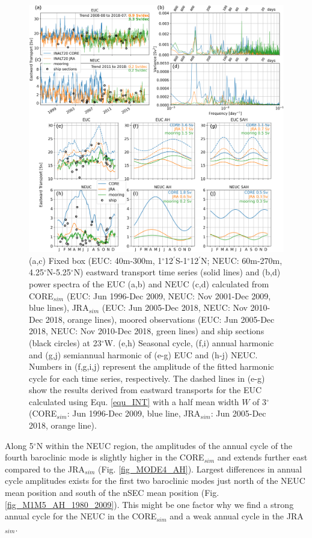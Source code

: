 \documentclass[os, manuscript]{copernicus}
\begin{document}
\begin{figure}[t]
	\includegraphics[width=12cm]{../../figures/paper/f05_EUC_NEUC_comp.eps}
	\caption{(a,c) Fixed box (EUC: 40m-300m, 1$^{\circ}$12$^\prime$S-1$^{\circ}$12$^\prime$N; NEUC: 60m-270m, 4.25$^{\circ}$N-5.25$^{\circ}$N) eastward transport time series (solid lines) and (b,d) power spectra of the EUC (a,b) and NEUC (c,d) calculated from CORE$_{sim}$ (EUC: Jun 1996-Dec 2009, NEUC: Nov 2001-Dec 2009, blue lines), JRA$_{sim}$ (EUC: Jun 2005-Dec 2018, NEUC: Nov 2010-Dec 2018, orange lines), moored observations (EUC: Jun 2005-Dec 2018, NEUC: Nov 2010-Dec 2018, green lines) and ship sections (black circles) at 23$^{\circ}$W. (e,h) Seasonal cycle, (f,i) annual harmonic and (g,j) semiannual harmonic of (e-g) EUC and (h-j) NEUC. Numbers in (f,g,i,j) represent the amplitude of the fitted harmonic cycle for each time series, respectively. The dashed lines in (e-g) show the results derived from eastward transports for the EUC calculated using Equ. \ref{equ_INT} with a half mean width $ W $ of 3$^{\circ}$ (CORE$_{sim}$: Jun 1996-Dec 2009, blue line, JRA$_{sim}$: Jun 2005-Dec 2018, orange line).}
	\label{fig_EUC_NEUC_ts}
\end{figure}

Along 5$^{\circ}$N within the NEUC region, the amplitudes of the annual cycle of the fourth baroclinic mode is slightly higher in the CORE$_{sim}$ and extends further east compared to the JRA$_{sim}$ (Fig. \ref{fig_MODE4_AH}). Largest differences in annual cycle amplitudes exists for the first two baroclinic modes just north of the NEUC mean position and south of the nSEC mean position (Fig. \ref{fig_M1M5_AH_1980_2009}). This might be one factor why we find a strong annual cycle for the NEUC in the CORE$_{sim}$ and a weak annual cycle in the JRA$_{sim}$. 
\end{document}
